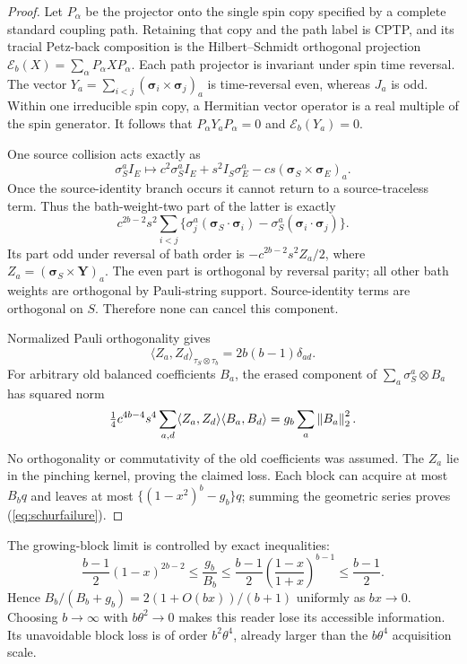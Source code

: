 \begin{proof}
Let $P_\alpha$ be the projector onto the single spin copy specified by a
complete standard coupling path. Retaining that copy and the path label is
CPTP, and its tracial Petz-back composition is the Hilbert--Schmidt
orthogonal projection $\mathcal E_b(X)=\sum_\alpha P_\alpha XP_\alpha$.
Each path projector is invariant under spin time reversal. The vector
$Y_a=\sum_{i<j}(\boldsymbol\sigma_i\times\boldsymbol\sigma_j)_a$ is
time-reversal even, whereas $J_a$ is odd. Within one irreducible spin copy,
a Hermitian vector operator is a real multiple of the spin generator.
It follows that $P_\alpha Y_aP_\alpha=0$ and $\mathcal E_b(Y_a)=0$.

One source collision acts exactly as
\[
 \sigma_S^a I_E\mapsto c^2\sigma_S^a I_E+s^2I_S\sigma_E^a
 -cs(\boldsymbol\sigma_S\times\boldsymbol\sigma_E)_a.
\]
Once the source-identity branch occurs it cannot return to a
source-traceless term. Thus the bath-weight-two part of the latter is exactly
\[
 c^{2b-2}s^2\sum_{i<j}
 \{\sigma_j^a(\boldsymbol\sigma_S\!\cdot\!\boldsymbol\sigma_i)
 -\sigma_S^a(\boldsymbol\sigma_i\!\cdot\!\boldsymbol\sigma_j)\}.
\]
Its part odd under reversal of bath order is
$-c^{2b-2}s^2Z_a/2$, where
$Z_a=(\boldsymbol\sigma_S\times\mathbf Y)_a$.
The even part is orthogonal by reversal parity; all other bath weights
are orthogonal by Pauli-string support. Source-identity terms are orthogonal
on $S$. Therefore none can cancel this component.

Normalized Pauli orthogonality gives
\[
 \langle Z_a,Z_d\rangle_{\tau_S\otimes\tau_b}
 =2b(b-1)\delta_{ad}.
\]
For arbitrary old balanced coefficients $B_a$, the erased component of
$\sum_a\sigma_S^a\otimes B_a$ has squared norm
\[
 \tfrac14c^{4b-4}s^4\sum_{a,d}\langle Z_a,Z_d\rangle
 \langle B_a,B_d\rangle
 =g_b\sum_a\left\lVert B_a\right\rVert_2^2.
\]
No orthogonality or commutativity of the old coefficients was assumed.
The $Z_a$ lie in the pinching kernel, proving the claimed loss. Each block
can acquire at most $B_bq$ and leaves at most $\{(1-x^2)^b-g_b\}q$;
summing the geometric series proves (\ref{eq:schurfailure}).
\end{proof}

The growing-block limit is controlled by exact inequalities:
\[
 \frac{b-1}{2}(1-x)^{2b-2}\le\frac{g_b}{B_b}
 \le\frac{b-1}{2}\left(\frac{1-x}{1+x}\right)^{b-1}
 \le\frac{b-1}{2}.
\]
Hence $B_b/(B_b+g_b)=2(1+O(bx))/(b+1)$ uniformly as $bx\to0$.
Choosing $b\to\infty$ with $b\theta^2\to0$ makes this reader lose its
accessible information. Its unavoidable block loss is of order
$b^2\theta^4$, already larger than the $b\theta^4$ acquisition scale.

